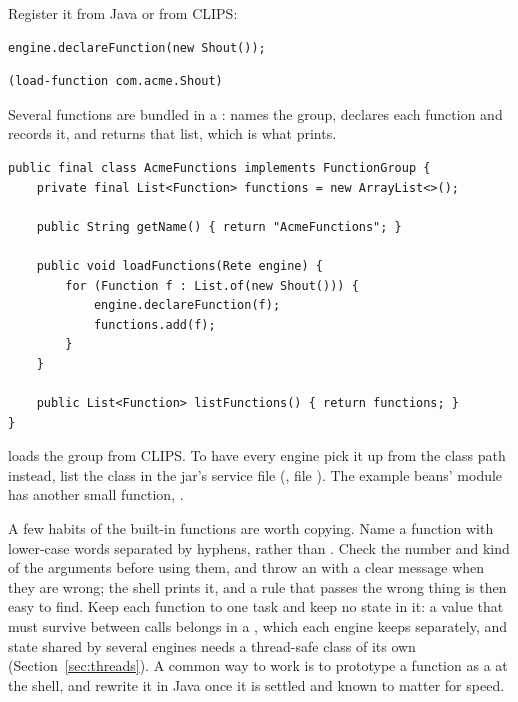 Register it from Java or from CLIPS:

\begin{lstlisting}[style=java]
engine.declareFunction(new Shout());
\end{lstlisting}
\begin{lstlisting}
(load-function com.acme.Shout)
\end{lstlisting}

Several functions are bundled in a : 
names the group,  declares each function and
records it, and  returns that list, which is what
 prints.

\begin{lstlisting}[style=java]
public final class AcmeFunctions implements FunctionGroup {
    private final List<Function> functions = new ArrayList<>();

    public String getName() { return "AcmeFunctions"; }

    public void loadFunctions(Rete engine) {
        for (Function f : List.of(new Shout())) {
            engine.declareFunction(f);
            functions.add(f);
        }
    }

    public List<Function> listFunctions() { return functions; }
}
\end{lstlisting}

 loads the group from
CLIPS. To have every engine pick it up from the class path instead, list
the class in the jar's service file (, file
). The example beans' module has
another small function, .

A few habits of the built-in functions are worth copying. Name a function
with lower-case words separated by hyphens,  rather than
. Check the number and kind of the arguments before using
them, and throw an  with a clear message
when they are wrong; the shell prints it, and a rule that passes the wrong
thing is then easy to find. Keep each function to one task and keep no
state in it: a value that must survive between calls belongs in a
, which each engine keeps separately, and state shared by
several engines needs a thread-safe class of its own
(Section~\ref{sec:threads}). A common way to work is to prototype a
function as a  at the shell, and rewrite it in Java once
it is settled and known to matter for speed.

